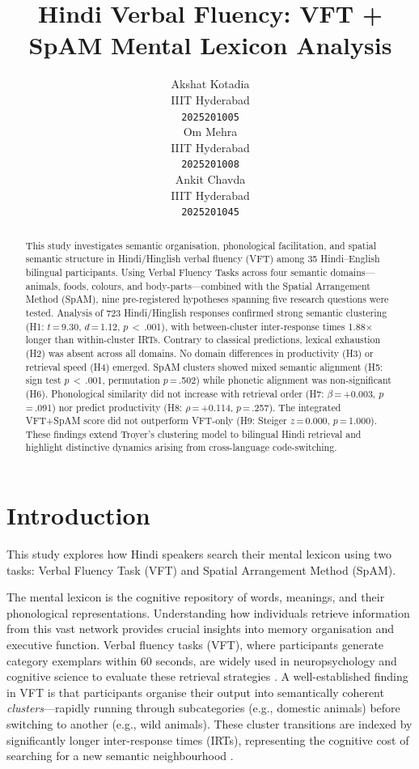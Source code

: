 \documentclass[12pt]{article}
\title{Hindi Verbal Fluency: VFT + SpAM Mental Lexicon Analysis}
\author{Akshat Kotadia \\
  IIIT Hyderabad \\
  \texttt{2025201005} \\\And
  Om Mehra \\
  IIIT Hyderabad \\
  \texttt{2025201008} \\\And
  Ankit Chavda \\
  IIIT Hyderabad \\
  \texttt{2025201045}}
\begin{document}
\maketitle

\begin{abstract}
This study investigates semantic organisation, phonological facilitation, and spatial semantic structure in Hindi/Hinglish verbal fluency (VFT) among 35 Hindi--English bilingual participants. Using Verbal Fluency Tasks across four semantic domains---animals, foods, colours, and body-parts---combined with the Spatial Arrangement Method (SpAM), nine pre-registered hypotheses spanning five research questions were tested. Analysis of 723 Hindi/Hinglish responses confirmed strong semantic clustering (H1: $t$\,=\,9.30, $d$\,=\,1.12, $p$\,$<$\,.001), with between-cluster inter-response times 1.88$\times$ longer than within-cluster IRTs. Contrary to classical predictions, lexical exhaustion (H2) was absent across all domains. No domain differences in productivity (H3) or retrieval speed (H4) emerged. SpAM clusters showed mixed semantic alignment (H5: sign test $p$\,$<$\,.001, permutation $p$\,=\,.502) while phonetic alignment was non-significant (H6). Phonological similarity did not increase with retrieval order (H7: $\beta$\,=\,+0.003, $p$\,=\,.091) nor predict productivity (H8: $\rho$\,=\,+0.114, $p$\,=\,.257). The integrated VFT+SpAM score did not outperform VFT-only (H9: Steiger $z$\,=\,0.000, $p$\,=\,1.000). These findings extend Troyer's clustering model to bilingual Hindi retrieval and highlight distinctive dynamics arising from cross-language code-switching.
\end{abstract}

\section{Introduction}

This study explores how Hindi speakers search their mental lexicon using two tasks: Verbal Fluency Task (VFT) and Spatial Arrangement Method (SpAM). 

The mental lexicon is the cognitive repository of words, meanings, and their phonological representations. Understanding how individuals retrieve information from this vast network provides crucial insights into memory organisation and executive function. Verbal fluency tasks (VFT), where participants generate category exemplars within 60 seconds, are widely used in neuropsychology and cognitive science to evaluate these retrieval strategies \citep{troyer1997}. A well-established finding in VFT is that participants organise their output into semantically coherent \textit{clusters}---rapidly running through subcategories (e.g., domestic animals) before switching to another (e.g., wild animals). These cluster transitions are indexed by significantly longer inter-response times (IRTs), representing the cognitive cost of searching for a new semantic neighbourhood \citep{hills2012}.
\end{document}
